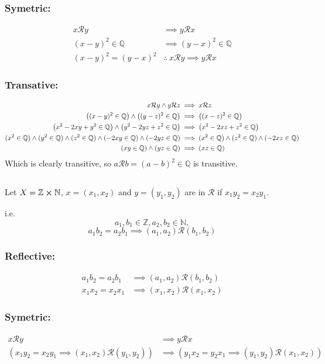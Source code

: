 \documentclass[]{article}
\newcommand{\Rel}{\mathcal{R}}
\newcommand{\N}{\mathbb{N}}
\newcommand{\Z}{\mathbb{Z}}
\newcommand{\Q}{\mathbb{Q}}
\begin{document}
\subsubsection{Symetric:}
\begin{align*}
	x \Rel y
		&\implies y \Rel x\\
	(x - y)^2 \in \Q
		&\implies (y-x)^2 \in \Q\\
	(x-y)^2 = (y-x)^2
		&\therefore \ x \Rel y \implies y \Rel x
\end{align*}

\subsubsection{Transative:}
\begin{align*}
	x \Rel y \land y \Rel z
		&\implies x \Rel z\\
	\qty((x - y)^2 \in \Q) \land \qty((y - z)^2 \in \Q)
		&\implies \qty((x-z)^2 \in \Q)\\
	\qty(x^2 - 2xy + y^2 \in \Q) \land \qty(y^2 - 2yz + z^2 \in \Q)
		&\implies \qty(x^2 - 2xz + z^2\in \Q)\\
	(x^2 \in \Q) \land (y^2 \in \Q) \land (z^2 \in \Q) \land (-2xy \in \Q) \land (-2yz \in \Q)
		&\implies (x^2 \in \Q) \land (z^2 \in \Q) \land (-2xz \in \Q)\\
	(xy \in \Q) \land (yz \in \Q)
		&\implies (xz \in \Q)
\end{align*}
Which is clearly transitive, so $a \Rel b = (a-b)^2 \in \Q$ is transitive.

\subsection{}
Let $X = \Z \cross \N$,
$x = (x_1, x_2)$ and $y = (y_1, y_2)$
are in $\Rel$ if $x_1 y_2 = x_2 y_1$.

i.e.
$$a_1, b_1 \in \Z, a_2, b_2 \in \N,$$
$$a_1 b_2 = a_2 b_1 \implies (a_1, a_2) \Rel (b_1, b_2)$$

\subsubsection{Reflective:}
\begin{align*}
	a_1 b_2 = a_2 b_1 &\implies (a_1, a_2) \Rel (b_1, b_2)\\
	x_1 x_2 = x_2 x_1 &\implies (x_1, x_2) \Rel (x_1, x_2)
\end{align*}

\subsubsection{Symetric:}
\begin{align*}
	x \Rel y
		&\implies y \Rel x\\
	(x_1 y_2 = x_2 y_1 \implies (x_1, x_2) \Rel (y_1, y_2))
		&\implies (y_1 x_2 = y_2 x_1 \implies (y_1, y_2) \Rel (x_1, x_2))
\end{align*}
\end{document}
